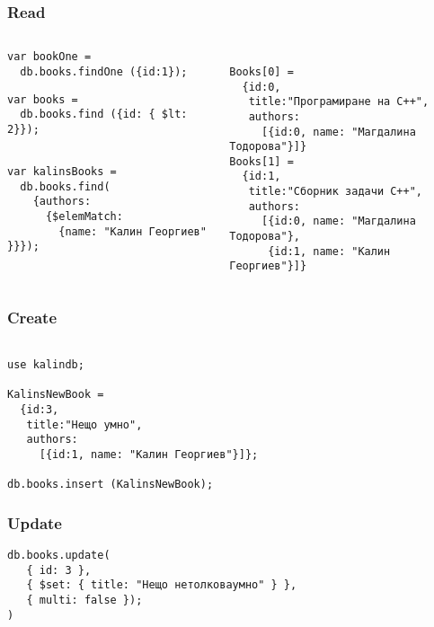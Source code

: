 \documentclass{beamer}
\begin{document}
\begin{frame}[fragile]
\frametitle{Read}

\lstset{language=JavaScript}


\begin{columns}
  \begin{column}{0.55\textwidth}

\begin{lstlisting}
var bookOne =
  db.books.findOne ({id:1});
\end{lstlisting}


\begin{lstlisting}
var books =
  db.books.find ({id: { $lt: 2}});
\end{lstlisting}


\begin{lstlisting}

var kalinsBooks =
  db.books.find(
    {authors:
      {$elemMatch:
        {name: "Калин Георгиев" }}});
\end{lstlisting}

  \end{column}
  \begin{column}{0.45\textwidth}
\begin{lstlisting}

Books[0] =
  {id:0,
   title:"Програмиране на C++",
   authors:
     [{id:0, name: "Магдалина Тодорова"}]}
Books[1] =
  {id:1,
   title:"Сборник задачи C++",
   authors:
     [{id:0, name: "Магдалина Тодорова"},
      {id:1, name: "Калин Георгиев"}]}
\end{lstlisting}
  \end{column}
\end{columns}


\end{frame}


\begin{frame}[fragile]
\frametitle{Create}

\begin{lstlisting}

use kalindb;

KalinsNewBook =
  {id:3,
   title:"Нещо умно",
   authors:
     [{id:1, name: "Калин Георгиев"}]};

db.books.insert (KalinsNewBook);
\end{lstlisting}


\end{frame}


\begin{frame}[fragile]
\frametitle{Update}

\begin{lstlisting}
db.books.update(
   { id: 3 },
   { $set: { title: "Нещо нетолковаумно" } },
   { multi: false });
)\end{lstlisting}


\end{frame}
\end{document}
